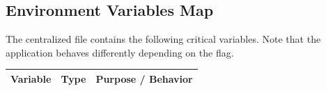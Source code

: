 \vspace{0.8cm}

\subsection{Environment Variables Map}

The centralized  file contains the following critical variables. Note that the application behaves differently depending on the  flag.

\vspace{0.5cm}

\begin{center}
\renewcommand{\arraystretch}{1.5}
\begin{longtable}{@{}p{4.5cm}p{2.5cm}p{8cm}@{}}
\toprule
\rowcolor{primary!10}
\textbf{Variable} & \textbf{Type} & \textbf{Purpose / Behavior} \\
\midrule
\endhead


\end{longtable}
\end{center}
